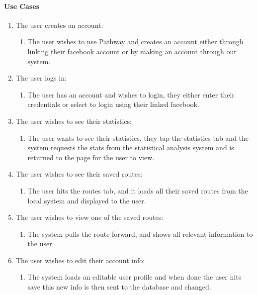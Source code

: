 ﻿\documentclass{article}
\begin{document}
\paragraph{Use Cases}
\begin{enumerate}
\item The user creates an account:
    \begin{enumerate}
    \item The user wishes to use Pathway and creates an account either through linking their           facebook account or by making an account through our system.
    \end{enumerate}
\item The user logs in:
    \begin{enumerate}
    \item The user has an account and wishes to login, they either enter their credentials or            select to login using their linked facebook.
    \end{enumerate}
\item The user wishes to see their statistics:
    \begin{enumerate}
    \item The user wants to see their statistics, they tap the statistics tab and the system requests the stats from the statistical analysis system and is returned to the page for the user to view.
    \end{enumerate}
\item The user wishes to see their saved routes:
    \begin{enumerate}
    \item The user hits the routes tab, and it loads all their saved routes from the local system     and displayed to the user.
    \end{enumerate}
\item The user wishes to view one of the saved routes:
    \begin{enumerate}
    \item The system pulls the route forward, and shows all relevant information to the user.
    \end{enumerate}
\item The user wishes to edit their account info:
    \begin{enumerate}
    \item The system loads an editable user profile and when done the user hits save this new info is then sent to the database and changed.
    \end{enumerate}
\end{enumerate}
\end{document}
